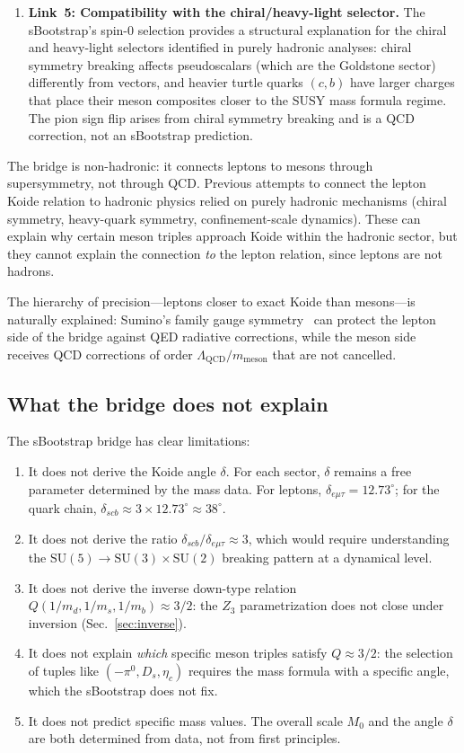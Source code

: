 \documentclass[prd,twocolumn,superscriptaddress,nofootinbib]{revtex4-2}
\begin{document}
\begin{enumerate}
\item \textbf{Link~5: Compatibility with the chiral/heavy-light
selector.}
The sBootstrap's spin-0 selection provides a structural explanation for
the chiral and heavy-light selectors identified in purely hadronic
analyses: chiral symmetry breaking affects pseudoscalars (which are the
Goldstone sector) differently from vectors, and heavier turtle quarks
$(c,b)$ have larger charges that place their meson composites closer to
the SUSY mass formula regime.  The pion sign flip arises from chiral
symmetry breaking and is a QCD correction, not an sBootstrap prediction.
\end{enumerate}

\noindent The bridge is non-hadronic: it connects leptons to mesons
through supersymmetry, not through QCD.  Previous attempts to connect
the lepton Koide relation to hadronic physics relied on purely hadronic
mechanisms (chiral symmetry, heavy-quark symmetry, confinement-scale
dynamics).  These can explain why certain meson triples approach Koide
within the hadronic sector, but they cannot explain the connection
\emph{to} the lepton relation, since leptons are not hadrons.

The hierarchy of precision---leptons closer to exact Koide than
mesons---is naturally explained: Sumino's family gauge
symmetry~\cite{Sumino2009} can protect the lepton side of the bridge
against QED radiative corrections, while the meson side receives QCD
corrections of order $\Lambda_{\text{QCD}}/m_{\text{meson}}$ that are
not cancelled.

\subsection{What the bridge does not explain}
\label{sec:gaps}

The sBootstrap bridge has clear limitations:
\begin{enumerate}
\item It does not derive the Koide angle $\delta$.  For each sector,
  $\delta$ remains a free parameter determined by the mass data.  For
  leptons, $\delta_{e\mu\tau}=12.73^\circ$; for the quark chain,
  $\delta_{scb}\approx 3\times 12.73^\circ\approx 38^\circ$.
\item It does not derive the ratio
  $\delta_{scb}/\delta_{e\mu\tau}\approx 3$, which would require
  understanding the $\text{SU}(5)\to\text{SU}(3)\times\text{SU}(2)$
  breaking pattern at a dynamical level.
\item It does not derive the inverse down-type relation
  $Q(1/m_d,1/m_s,1/m_b)\approx 3/2$: the $Z_3$ parametrization does
  not close under inversion (Sec.~\ref{sec:inverse}).
\item It does not explain \emph{which} specific meson triples satisfy
  $Q\approx 3/2$: the selection of tuples like
  $(-\pi^0,D_s,\eta_c)$ requires the mass formula with a
  specific angle, which the sBootstrap does not fix.
\item It does not predict specific mass values.  The overall scale $M_0$
  and the angle $\delta$ are both determined from data, not from first
  principles.
\end{enumerate}
\end{document}
